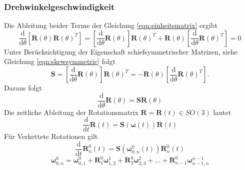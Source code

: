 \subsubsection{Drehwinkelgeschwindigkeit}
Die Ableitung beider Terme der Gleichung \ref{eqn:einheitsmatrix} ergibt
\begin{equation} 
	\frac{\text{d}}{\text{d}\theta}\left[\bm{R}(\theta)\bm{R}(\theta)^T\right] = 	\left[\frac{\text{d}}{\text{d}\theta} {\bm{R}}(\theta)\right]\bm{R}(\theta)^T + \bm{R}(\theta)\left[\frac{\text{d}}{\text{d}\theta} {\bm{R}}(\theta)^T\right] = 0
\end{equation} 
Unter Berücksichtigung der Eigenschaft schiefsymmetrischer Matrizen, siehe Gleichung \ref{eqn:skewsymmetric} folgt
\begin{equation}
	\label{eqn:skewsymm}
	\bm{S} = \left[\frac{\text{d}}{\text{d}\theta}{\bm{R}}(\theta)\right]\bm{R}(\theta)^T  = -\bm{R}(\theta)     \left[\frac{\text{d}}{\text{d}\theta}{\bm{R}}(\theta)^T\right].
\end{equation} 
%
Daraus folgt
%
\begin{equation}
	\frac{\text{d}}{\text{d}\theta}\bm{R}(\theta) = \bm{SR}(\theta)
\end{equation} 
%
Die zeitliche Ableitung der Rotationsmatrix $\bm{R} = \bm{R}(t) \in SO(3)$ lautet
%
\begin{equation}
	\frac{\text{d}}{\text{d}t}\bm{R}(t) = \bm{S}\left(\bm{\omega}(t)\right)\bm{R}(t)
\end{equation} 
%
Für Verkettete Rotationen gilt
%
\begin{equation}
	\frac{\text{d}}{\text{d}t}\bm{R}^0_n(t) = \bm{S}\left(\bm{\omega}^0_{0,n}(t)\right)\bm{R}^0_n(t)
\end{equation} 
\begin{equation}
	\bm{\omega}^0_{0,n} = \bm{\omega}^0_{0,1} + \bm{R}^0_1\bm{\omega}^1_{1,2} + \bm{R}^0_2\bm{\omega}^2_{2,3} + ... + \bm{R}^0_{n-1}\bm{\omega}^{n-1}_{n-1,n}
\end{equation} 
%
%
